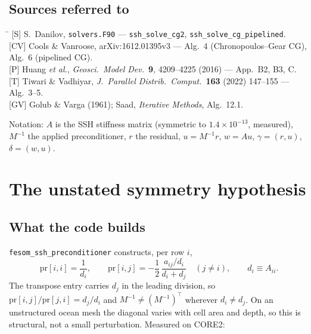 \documentclass[11pt,a4paper]{article}
\newcommand{\Mi}{M^{-1}}
\newcommand{\src}[1]{\textsf{#1}}
\begin{document}
\subsection*{Sources referred to}

\begin{tabbing}
\hspace{1.1cm}\=\kill
\src{[S]}  \> S.~Danilov, \texttt{solvers.F90} --- \texttt{ssh\_solve\_cg2},
              \texttt{ssh\_solve\_cg\_pipelined}.\\
\src{[CV]} \> Cools \& Vanroose, arXiv:1612.01395v3 --- Alg.~4 (Chronopoulos--Gear CG),
              Alg.~6 (pipelined CG).\\
\src{[P]}  \> Huang \emph{et al.}, \emph{Geosci.\ Model Dev.}\ \textbf{9}, 4209--4225
              (2016) --- App.~B2, B3, C.\\
\src{[T]}  \> Tiwari \& Vadhiyar, \emph{J.\ Parallel Distrib.\ Comput.}\ \textbf{163}
              (2022) 147--155 --- Alg.~3--5.\\
\src{[GV]} \> Golub \& Varga (1961); Saad, \emph{Iterative Methods}, Alg.~12.1.
\end{tabbing}

\noindent
Notation: $A$ is the SSH stiffness matrix (symmetric to $1.4\times10^{-13}$, measured),
$\Mi$ the applied preconditioner, $r$ the residual, $u=\Mi r$, $w=Au$, $\gamma=(r,u)$,
$\delta=(w,u)$.

\section{The unstated symmetry hypothesis}
\label{sec:main}

\subsection{What the code builds}

\texttt{fesom\_ssh\_preconditioner} constructs, per row $i$,
\begin{equation}
  \mathrm{pr}[i,i]=\frac{1}{d_i},\qquad
  \mathrm{pr}[i,j]=-\frac{1}{2}\,\frac{a_{ij}/d_i}{d_i+d_j}\quad (j\neq i),
  \qquad d_i \equiv A_{ii}.
\end{equation}
The transpose entry carries $d_j$ in the leading division, so
$\mathrm{pr}[i,j]/\mathrm{pr}[j,i]=d_j/d_i$ and $\Mi\neq(\Mi)^{\!\top}$ wherever
$d_i\neq d_j$. On an unstructured ocean mesh the diagonal varies with cell area and
depth, so this is structural, not a small perturbation. Measured on CORE2:
\end{document}
